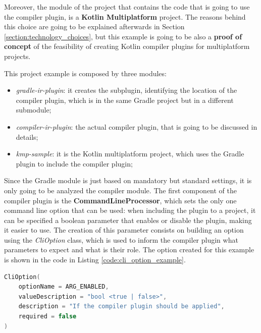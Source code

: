 Moreover, the module of the project that contains the code that is going to use the compiler plugin, is a \textbf{Kotlin Multiplatform} project. The reasons behind this choice are going to be explained afterwards in Section \ref{section:technology_choices}, but this example is going to be also a \textbf{proof of concept} of the feasibility of creating Kotlin compiler plugins for multiplatform projects.

This project example is composed by three modules:
\begin{itemize}
    \item \textit{gradle-ir-plugin}: it creates the subplugin, identifying the location of the compiler plugin, which is in the same Gradle project but in a different submodule;
    \item \textit{compiler-ir-plugin}: the actual compiler plugin, that is going to be discussed in details;
    \item \textit{kmp-sample}: it is the Kotlin multiplatform project, which uses the Gradle plugin to include the compiler plugin;
\end{itemize}

Since the Gradle module is just based on mandatory  but standard settings, it is only going to be analyzed the compiler module.\newline
The first component of the compiler plugin is the \textbf{CommandLineProcessor}, which sets the only one command line option that can be used: when including the plugin to a project, it can be specified a boolean parameter that enables or disable the plugin, making it easier to use.\newline
The creation of this parameter consists on building an option using the \textit{CliOption} class, which is used to inform the compiler plugin what parameters to expect and what is their role. The option created for this example is shown in the code in Listing \ref{code:cli_option_example}.
\begin{lstlisting}[caption={Creation of compiler option that enables or disables the plugin}, captionpos=b, language=Kotlin, label={code:cli_option_example}]
CliOption(
    optionName = ARG_ENABLED,
    valueDescription = "bool <true | false>",
    description = "If the compiler plugin should be applied",
    required = false
)
\end{lstlisting}

